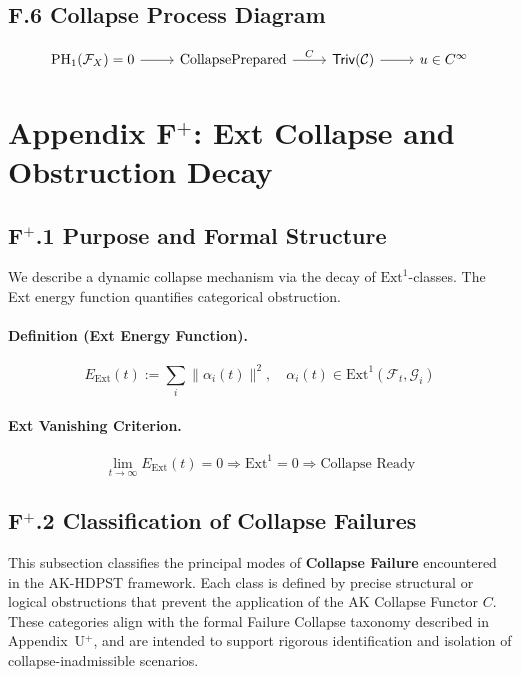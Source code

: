 \documentclass[11pt]{article}
\begin{document}
\subsection*{F.6 Collapse Process Diagram}

\[
\begin{tikzcd}
\mathrm{PH}_1(\mathcal{F}_X) = 0 \arrow[r] & \text{CollapsePrepared} \arrow[r, "C"] & \mathsf{Triv}(\mathcal{C}) \arrow[r] & u \in C^\infty
\end{tikzcd}
\]


\section*{Appendix F$^+$: Ext Collapse and Obstruction Decay}

\subsection*{F$^+$.1 Purpose and Formal Structure}

We describe a dynamic collapse mechanism via the decay of \( \mathrm{Ext}^1 \)-classes. The Ext energy function quantifies categorical obstruction.

\paragraph{Definition (Ext Energy Function).}
\[
E_{\mathrm{Ext}}(t) := \sum_i \| \alpha_i(t) \|^2, \quad \alpha_i(t) \in \mathrm{Ext}^1(\mathcal{F}_t, \mathcal{G}_i)
\]

\paragraph{Ext Vanishing Criterion.}
\[
\lim_{t \to \infty} E_{\mathrm{Ext}}(t) = 0 \Rightarrow \mathrm{Ext}^1 = 0 \Rightarrow \text{Collapse Ready}
\]

\subsection*{F$^+$.2 Classification of Collapse Failures}

This subsection classifies the principal modes of \textbf{Collapse Failure} encountered in the AK-HDPST framework. Each class is defined by precise structural or logical obstructions that prevent the application of the AK Collapse Functor \( C \). These categories align with the formal Failure Collapse taxonomy described in Appendix~U$^+$, and are intended to support rigorous identification and isolation of collapse-inadmissible scenarios.
\end{document}
